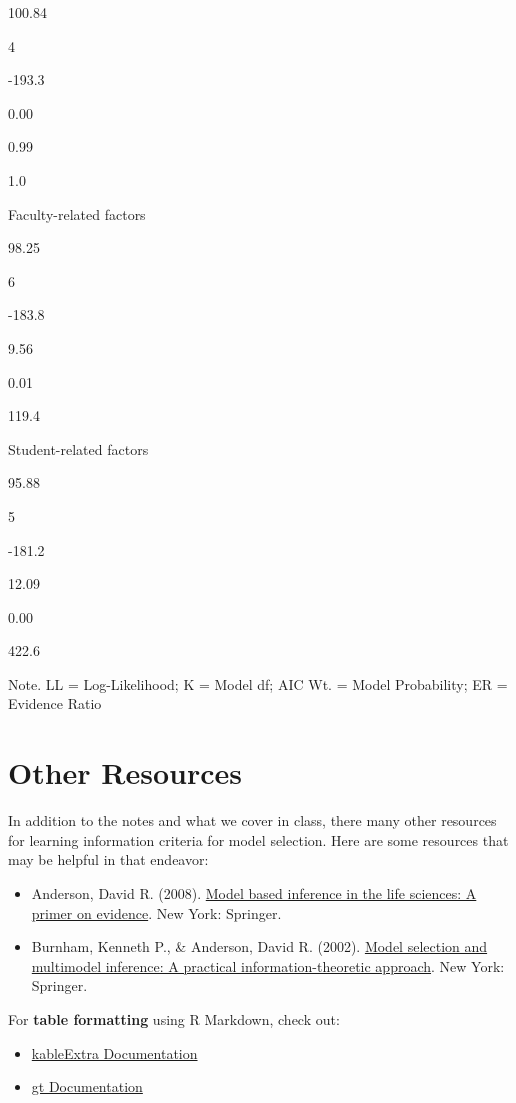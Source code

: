 \documentclass[]{book}
\providecommand{\tightlist}{%
  \setlength{\itemsep}{0pt}\setlength{\parskip}{0pt}}
\begin{document}
100.84

4

-193.3

0.00

0.99

1.0

Faculty-related factors

98.25

6

-183.8

9.56

0.01

119.4

Student-related factors

95.88

5

-181.2

12.09

0.00

422.6

{Note.} LL = Log-Likelihood; K = Model df; AIC Wt. = Model Probability; ER = Evidence Ratio

\hypertarget{other-resources-2}{%
\section*{Other Resources}\label{other-resources-2}}

In addition to the notes and what we cover in class, there many other resources for learning information criteria for model selection. Here are some resources that may be helpful in that endeavor:

\begin{itemize}
\tightlist
\item
  Anderson, David R. (2008). \href{https://link-springer-com.ezp3.lib.umn.edu/book/10.1007\%2F978-0-387-74075-1}{Model based inference in the life sciences: A primer on evidence}. New York: Springer.
\item
  Burnham, Kenneth P., \& Anderson, David R. (2002). \href{http://ecologia.ib.usp.br/bie5782/lib/exe/fetch.php?media=bie5782:pdfs:burnham_anderson2002.pdf}{Model selection and multimodel inference: A practical information-theoretic approach}. New York: Springer.
\end{itemize}

For \textbf{table formatting} using R Markdown, check out:

\begin{itemize}
\tightlist
\item
  \href{https://haozhu233.github.io/kableExtra/}{kableExtra Documentation}
\item
  \href{https://gt.rstudio.com/}{gt Documentation}
\end{itemize}
\end{document}
